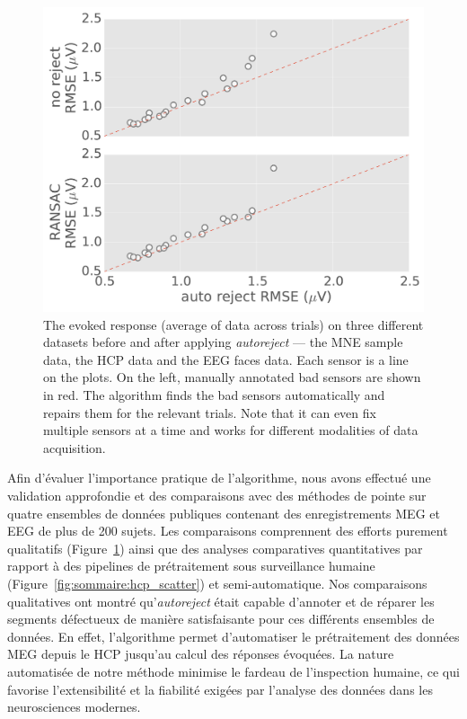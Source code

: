 \begin{figure}[htb!]
	\centering
	\includegraphics[width=0.9\linewidth]{figures/figure5.pdf}
    \caption[The evoked response (average of data across trials) on three different datasets before and after applying \emph{autoreject}]{The evoked response (average of data across trials) on three different datasets before and after applying \emph{autoreject} --- the MNE sample data, the HCP data and the EEG faces data. Each sensor is a line on the plots. On the left, manually annotated bad sensors are shown in red. The algorithm finds the bad sensors automatically and repairs them for the relevant trials. Note that it can even fix multiple sensors at a time and works for different modalities of data acquisition.}
    \label{fig:sommaire:sample_evoked}
\end{figure}

Afin d'évaluer l'importance pratique de l'algorithme, nous avons effectué une validation approfondie et des comparaisons avec des méthodes de pointe sur quatre ensembles de données publiques contenant des enregistrements MEG et EEG de plus de 200 sujets. Les comparaisons comprennent des efforts purement qualitatifs (Figure~\ref{fig:sommaire:sample_evoked}) ainsi que des analyses comparatives quantitatives par rapport à des pipelines de prétraitement sous surveillance humaine (Figure~\ref{fig:sommaire:hcp_scatter}) et semi-automatique. Nos comparaisons qualitatives ont montré qu'\emph{autoreject} était capable d'annoter et de réparer les segments défectueux de manière satisfaisante pour ces différents ensembles de données. En effet, l'algorithme permet d'automatiser le prétraitement des données MEG depuis le HCP jusqu'au calcul des réponses évoquées. La nature automatisée de notre méthode minimise le fardeau de l'inspection humaine, ce qui favorise l'extensibilité et la fiabilité exigées par l'analyse des données dans les neurosciences modernes.

